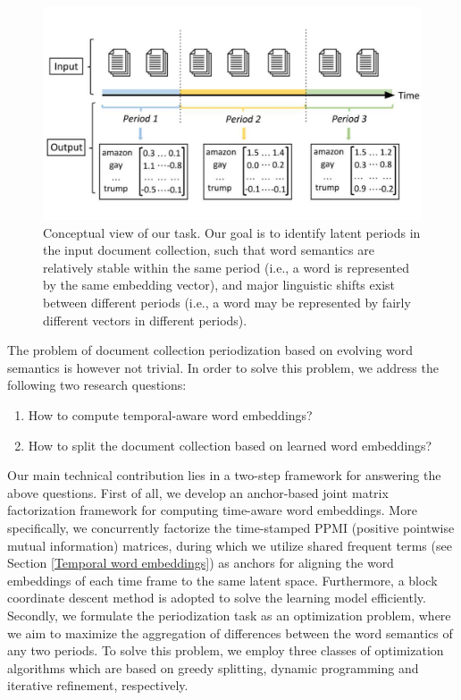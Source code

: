 \documentclass[output=paper]{langsci/langscibook}
\begin{document}
\begin{figure}[ht]
\centering
\includegraphics[width=1.0\textwidth]{figures/DUAN_overall.png}
\caption{Conceptual view of our task. Our goal is to identify latent periods in the input document collection, such that word semantics are relatively stable within the same period (i.e., a word is represented by the same embedding vector), and major linguistic shifts exist between different periods (i.e., a word may be represented by fairly different vectors in different periods).}\label{overall}
\end{figure}


The problem of document collection periodization based on evolving word semantics is however not trivial. In order to solve this problem, we address the following two research questions:\largerpage

\begin{enumerate}[label=\alph*.]
\item How to compute temporal-aware word embeddings?
\item How to split the document collection based on learned word embeddings?
\end{enumerate}

Our main technical contribution lies in a two-step framework for answering the above questions. First of all, we develop an anchor-based joint matrix factorization framework for computing time-aware word embeddings. More specifically, we concurrently factorize the time-stamped PPMI (positive pointwise mutual information) matrices, during which we utilize shared frequent terms (see Section \ref{Temporal word embeddings}) as anchors for aligning the word embeddings of each time frame to the same latent space. Furthermore, a block coordinate descent method is adopted to solve the learning model efficiently.
Secondly, we formulate the periodization task as an optimization problem, where we aim to maximize the aggregation of differences between the word semantics of any two periods. To solve this problem, we employ three classes of optimization algorithms which are based on greedy splitting, dynamic programming and iterative refinement, respectively. 
\end{document}
